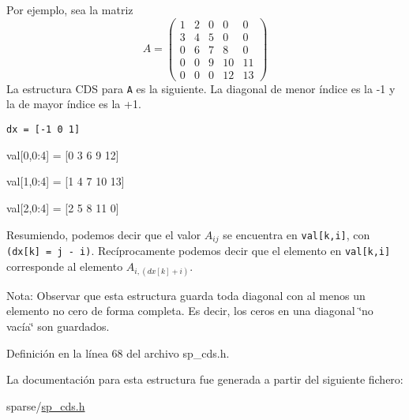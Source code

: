 Por ejemplo, sea la matriz \[ A = \left( \begin{array}{ccccc} 1 & 2 & 0 & 0 & 0 \\ 3 & 4 & 5 & 0 & 0 \\ 0 & 6 & 7 & 8 & 0 \\ 0 & 0 & 9 & 10 & 11 \\ 0 & 0 & 0 & 12 & 13 \end{array}\right) \] La estructura CDS para {\tt A} es la siguiente. La diagonal de menor índice es la -1 y la de mayor índice es la +1.

{\tt  dx = \mbox{[}-1 0 1\mbox{]}\par
 val\mbox{[}0,0:4\mbox{]} = \mbox{[}0 3 6 9 12\mbox{]}\par
 val\mbox{[}1,0:4\mbox{]} = \mbox{[}1 4 7 10 13\mbox{]}\par
 val\mbox{[}2,0:4\mbox{]} = \mbox{[}2 5 8 11 0\mbox{]}\par
 }

Resumiendo, podemos decir que el valor $A_{ij}$ se encuentra en {\tt val\mbox{[}k,i\mbox{]}}, con {\tt (dx\mbox{[}k\mbox{]} = j - i)}. Recíprocamente podemos decir que el elemento en {\tt val\mbox{[}k,i\mbox{]}} corresponde al elemento $A_{i,(dx[k]+i)}$.

\begin{Desc}
\item[Nota:]Observar que esta estructura guarda toda diagonal con al menos un elemento no cero de forma completa. Es decir, los ceros en una diagonal \char`\"{}no vacía\char`\"{} son guardados. \end{Desc}


Definición en la línea 68 del archivo sp\_\-cds.h.

La documentación para esta estructura fue generada a partir del siguiente fichero:\begin{CompactItemize}
\item 
sparse/\hyperlink{sp__cds_8h}{sp\_\-cds.h}\end{CompactItemize}
